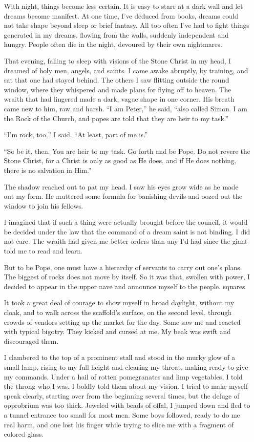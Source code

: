 With night, things become less certain. It is easy to stare at a dark wall and let dreams become manifest. At one time, I’ve deduced from books, dreams could not take shape beyond sleep or brief fantasy. All too often I’ve had to fight things generated in my dreams, flowing from the walls, suddenly independent and hungry. People often die in the night, devoured by their own nightmares.

That evening, falling to sleep with visions of the Stone Christ in my head, I dreamed of holy men, angels, and saints. I came awake abruptly, by training, and sat that one had stayed behind. The others I saw flitting outside the round window, where they whispered and made plans for flying off to heaven. The wraith that had lingered made a dark, vague shape in one corner. His breath came new to him, raw and harsh. “I am Peter,” he said, “also called Simon. I am the Rock of the Church, and popes are told that they are heir to my task.”

“I’m rock, too,” I said. “At least, part of me is.”

“So be it, then. You are heir to my task. Go forth and be Pope. Do not revere the Stone Christ, for a Christ is only as good as He does, and if He does nothing, there is no salvation in Him.”

The shadow reached out to pat my head. I saw his eyes grow wide as he made out my form. He muttered some formula for banishing devils and oozed out the window to join his fellows.

I imagined that if such a thing were actually brought before the council, it would be decided under the law that the command of a dream saint is not binding. I did not care. The wraith had given me better orders than any I’d had since the giant told me to read and learn.

But to be Pope, one must have a hierarchy of servants to carry out one’s plans. The biggest of rocks does not move by itself. So it was that, swollen with power, I decided to appear in the upper nave and announce myself to the people.
squares

It took a great deal of courage to show myself in broad daylight, without my cloak, and to walk across the scaffold’s surface, on the second level, through crowds of vendors setting up the market for the day. Some saw me and reacted with typical bigotry. They kicked and cursed at me. My beak was swift and discouraged them.

I clambered to the top of a prominent stall and stood in the murky glow of a small lamp, rising to my full height and clearing my throat, making ready to give my commands. Under a hail of rotten pomegranates and limp vegetables, I told the throng who I was. I boldly told them about my vision. I tried to make myself speak clearly, starting over from the beginning several times, but the deluge of opprobrium was too thick. Jeweled with beads of offal, I jumped down and fled to a tunnel entrance too small for most men. Some boys followed, ready to do me real harm, and one lost his finger while trying to slice me with a fragment of colored glass.

